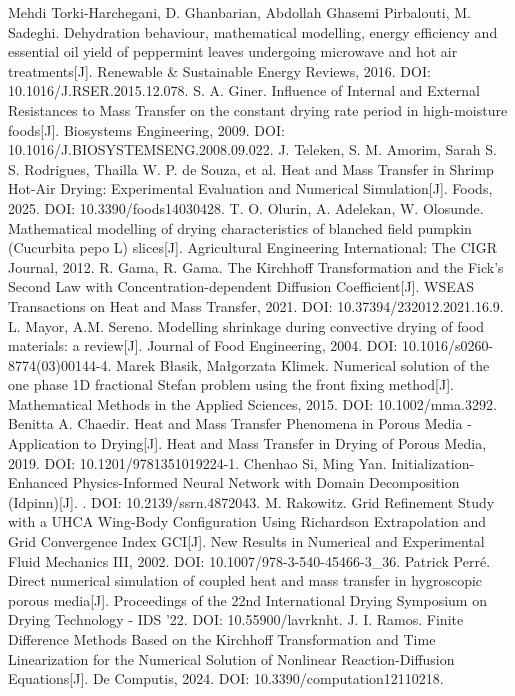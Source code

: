  Mehdi Torki-Harchegani, D. Ghanbarian, Abdollah Ghasemi Pirbalouti, M. Sadeghi. Dehydration behaviour, mathematical modelling, energy efficiency and essential oil yield of peppermint leaves undergoing microwave and hot air treatments[J]. Renewable \& Sustainable Energy Reviews, 2016. DOI: 10.1016/J.RSER.2015.12.078.
 S. A. Giner. Influence of Internal and External Resistances to Mass Transfer on the constant drying rate period in high-moisture foods[J]. Biosystems Engineering, 2009. DOI: 10.1016/J.BIOSYSTEMSENG.2008.09.022.
 J. Teleken, S. M. Amorim, Sarah S. S. Rodrigues, Thailla W. P. de Souza, et al. Heat and Mass Transfer in Shrimp Hot-Air Drying: Experimental Evaluation and Numerical Simulation[J]. Foods, 2025. DOI: 10.3390/foods14030428.
 T. O. Olurin, A. Adelekan, W. Olosunde. Mathematical modelling of drying characteristics of blanched field pumpkin (Cucurbita pepo L) slices[J]. Agricultural Engineering International: The CIGR Journal, 2012.
 R. Gama, R. Gama. The Kirchhoff Transformation and the Fick's Second Law with Concentration-dependent Diffusion Coefficient[J]. WSEAS Transactions on Heat and Mass Transfer, 2021. DOI: 10.37394/232012.2021.16.9.
 L. Mayor, A.M. Sereno. Modelling shrinkage during convective drying of food materials: a review[J]. Journal of Food Engineering, 2004. DOI: 10.1016/s0260-8774(03)00144-4.
 Marek Błasik, Małgorzata Klimek. Numerical solution of the one phase 1D fractional Stefan problem using the front fixing method[J]. Mathematical Methods in the Applied Sciences, 2015. DOI: 10.1002/mma.3292.
 Benitta A. Chaedir. Heat and Mass Transfer Phenomena in Porous Media - Application to Drying[J]. Heat and Mass Transfer in Drying of Porous Media, 2019. DOI: 10.1201/9781351019224-1.
 Chenhao Si, Ming Yan. Initialization-Enhanced Physics-Informed Neural Network with Domain Decomposition (Idpinn)[J]. . DOI: 10.2139/ssrn.4872043.
 M. Rakowitz. Grid Refinement Study with a UHCA Wing-Body Configuration Using Richardson Extrapolation and Grid Convergence Index GCI[J]. New Results in Numerical and Experimental Fluid Mechanics III, 2002. DOI: 10.1007/978-3-540-45466-3_36.
 Patrick Perré. Direct numerical simulation of coupled heat and mass transfer in hygroscopic porous media[J]. Proceedings of the 22nd International Drying Symposium on Drying Technology - IDS '22. DOI: 10.55900/lavrknht.
 J. I. Ramos. Finite Difference Methods Based on the Kirchhoff Transformation and Time Linearization for the Numerical Solution of Nonlinear Reaction-Diffusion Equations[J]. De Computis, 2024. DOI: 10.3390/computation12110218.
